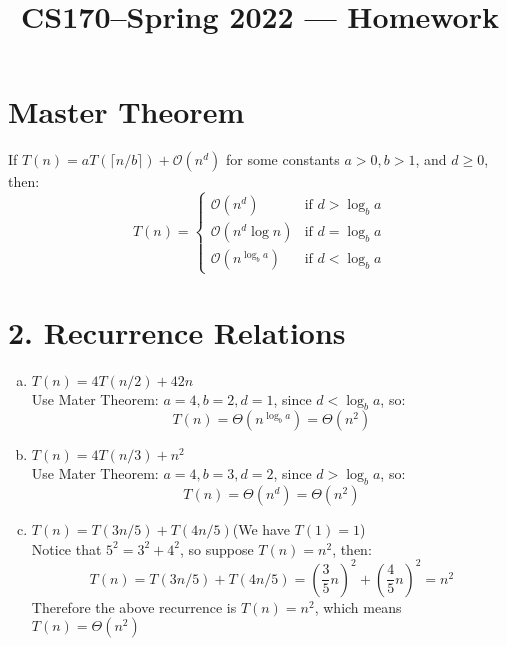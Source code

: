 \documentclass[11pt]{article}
\title{CS170--Spring 2022 --- Homework \Homework}
\author{\Name}
\date{}
\newenvironment{qparts}{\begin{enumerate}[(a)]}{\end{enumerate}}
\begin{document}
	\maketitle
	
	
	\section*{Master Theorem}
	If $T(n) = aT( \lceil n/b  \rceil) + \mathcal{O}(n^d)$ for some constants $a>0, b>1$, and $d\geq 0$, then:
	$$T(n) = \begin{cases}
		\mathcal{O}(n^d) & \text{if } d > \log_ba\\
		\mathcal{O}(n^d\log n) & \text{if } d = \log_ba\\
		\mathcal{O}(n^{\log_ba}) & \text{if } d < \log_ba
	\end{cases}$$
	
	\vspace{0.7cm}
	
	\section*{2. Recurrence Relations}
	\begin{qparts}
		\item $T(n) = 4T(n/2) + 42n$\\
		Use Mater Theorem: $a = 4, b = 2, d = 1$, since $d < \log_ba$, so:
		$$T(n) = \Theta(n^{\log_ba}) = \Theta(n^2)$$
		
		\item $T(n) = 4T(n/3) + n^2$\\
		Use Mater Theorem: $a = 4, b = 3, d = 2$, since $d > \log_ba$, so:
		$$T(n) = \Theta(n^{d}) = \Theta(n^2)$$
		
		\item $T(n) = T(3n/5) + T(4n/5)$(We have $T(1) = 1$)\\
		Notice that $5^2 = 3^2 + 4^2$, so suppose $T(n) = n^2$, then:
		$$T(n) = T(3n/5) + T(4n/5) = (\frac{3}{5}n)^2 + (\frac{4}{5}n)^2 = n^2$$
		Therefore the above recurrence is $T(n) = n^2$, which means $T(n) = \Theta(n^2)$
	\end{qparts}
	
	\vspace{0.7cm}
	
\end{document}

